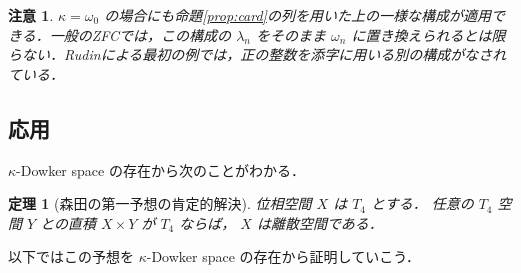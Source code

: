 \documentclass[leqno, 12pt]{ltjsarticle}
\newtheorem{thm}{定理}
\newtheorem*{rmk}{注意}
\newcommand{\omegazero}{\omega_{0}}
\begin{document}
\begin{rmk}
$\kappa=\omegazero$
の場合にも命題\ref{prop:card}の列を用いた上の一様な構成が適用できる．一般のZFCでは，この構成の
$\lambda_{n}$
をそのまま
$\omega_{n}$
に置き換えられるとは限らない．Rudinによる最初の例では，正の整数を添字に用いる別の構成がなされている\cite{1}．
\end{rmk}

\subsection{応用}

$\kappa$-Dowker space
の存在から次のことがわかる．

\begin{thm}[森田の第一予想の肯定的解決]
位相空間
$X$
は
$T_{4}$
とする．
任意の
$T_{4}$
空間
$Y$
との直積
$X\times Y$
が
$T_{4}$
ならば，
$X$
は離散空間である．
\end{thm}
以下ではこの予想を
$\kappa$-Dowker space
の存在から証明していこう．
\end{document}
